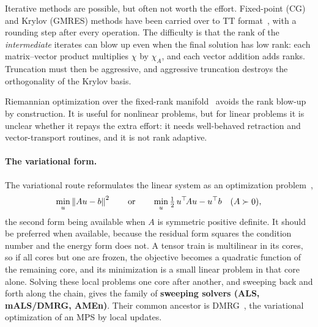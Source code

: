 Iterative methods are possible, but often not worth the effort. Fixed-point
(CG) and Krylov (GMRES) methods have been carried over to TT
format~\cite{Dolgov2012a,Ballani2013}, with a rounding step after every
operation. The difficulty is that the rank of the \emph{intermediate} iterates
can blow up even when the final solution has low rank: each matrix--vector
product multiplies $\chi$ by $\chi_A$, and each vector addition adds ranks.
Truncation must then be aggressive, and aggressive truncation destroys the
orthogonality of the Krylov basis.

Riemannian optimization over the fixed-rank manifold~\cite{Kressner2016} avoids
the rank blow-up by construction. It is useful for nonlinear problems, but for
linear problems it is unclear whether it repays the extra effort: it needs
well-behaved retraction and vector-transport routines, and it is not rank
adaptive.

\paragraph{The variational form.}
The variational route reformulates the linear system as an optimization
problem~\cite{Oseledets2012},
\begin{equation}
  \min_u \left\|Au - b\right\|^2
  \qquad\text{or}\qquad
  \min_u \tfrac{1}{2}\, u^{\top}\! A u - u^{\top} b \quad (A \succ 0),
  \label{eq:tt-linear-min}
\end{equation}%
the second form being available when $A$ is symmetric positive definite. It
should be preferred when available, because the residual form squares the
condition number and the energy form does not. A tensor train is multilinear in
its cores, so if all cores but one are frozen, the objective becomes a quadratic
function of the remaining core, and its minimization is a small linear problem
in that core alone. Solving these local problems one core after another, and
sweeping back and forth along the chain, gives the family of \textbf{sweeping
solvers (ALS, mALS/DMRG, AMEn)}. Their common ancestor is DMRG~\cite{White1992,
Schollwoeck2011}, the variational optimization of an MPS by local updates.

